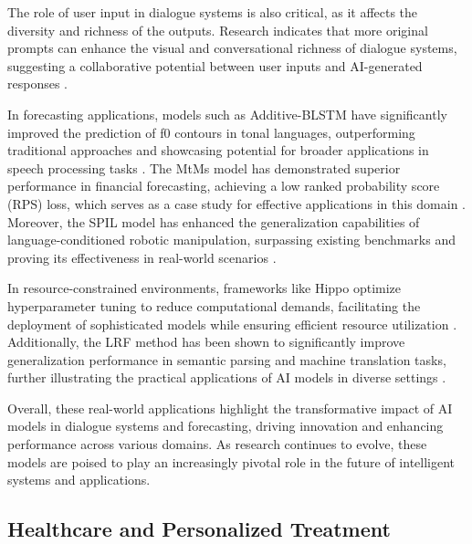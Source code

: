 The role of user input in dialogue systems is also critical, as it affects the diversity and richness of the outputs. Research indicates that more original prompts can enhance the visual and conversational richness of dialogue systems, suggesting a collaborative potential between user inputs and AI-generated responses \cite{palmini2024patternscreativityuserinput}.



In forecasting applications, models such as Additive-BLSTM have significantly improved the prediction of f0 contours in tonal languages, outperforming traditional approaches and showcasing potential for broader applications in speech processing tasks \cite{yuan2018generatingmandarincantonesef0}. The MtMs model has demonstrated superior performance in financial forecasting, achieving a low ranked probability score (RPS) loss, which serves as a case study for effective applications in this domain \cite{stank2024designingtimeseriesmodelshypernetworks}. Moreover, the SPIL model has enhanced the generalization capabilities of language-conditioned robotic manipulation, surpassing existing benchmarks and proving its effectiveness in real-world scenarios \cite{zhou2024languageconditionedimitationlearningbase}.



In resource-constrained environments, frameworks like Hippo optimize hyperparameter tuning to reduce computational demands, facilitating the deployment of sophisticated models while ensuring efficient resource utilization \cite{shin2020hippotaminghyperparameteroptimization}. Additionally, the LRF method has been shown to significantly improve generalization performance in semantic parsing and machine translation tasks, further illustrating the practical applications of AI models in diverse settings \cite{zheng2023layerwiserepresentationfusioncompositional}.



Overall, these real-world applications highlight the transformative impact of AI models in dialogue systems and forecasting, driving innovation and enhancing performance across various domains. As research continues to evolve, these models are poised to play an increasingly pivotal role in the future of intelligent systems and applications.



\subsection{Healthcare and Personalized Treatment} \label{subsec:Healthcare and Personalized Treatment}

